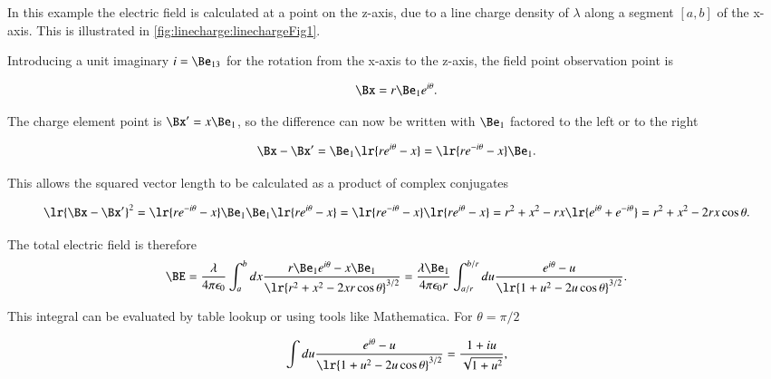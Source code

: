 %
%
In this example the electric field is calculated at a point on the z-axis, due to a line charge density of \( \lambda \) along a segment \( [a,b] \) of the x-axis.
This is illustrated in \cref{fig:linecharge:linechargeFig1}.

Introducing a unit imaginary \( i = \Be_{13} \) for the rotation from the x-axis to the z-axis, the field point observation point is

\begin{dmath}\label{eqn:linecharge:120}
\Bx = r \Be_1 e^{i \theta}.
\end{dmath}

The charge element point is \( \Bx' = x \Be_1 \), so the difference can now be written with \( \Be_1 \) factored to the left or to the right

\begin{equation}\label{eqn:linecharge:20}
\Bx - \Bx'
= \Be_1\lr{ r e^{i\theta} - x }
= \lr{ r e^{-i\theta} - x } \Be_1.
\end{equation}

This allows the squared vector length to be calculated as a product of complex conjugates

\begin{dmath}\label{eqn:linecharge:40}
\lr{ \Bx - \Bx' }^2
= \lr{ r e^{-i\theta} - x } \Be_1 \Be_1\lr{ r e^{i\theta} - x }
= \lr{ r e^{-i\theta} - x } \lr{ r e^{i\theta} - x }
= r^2 + x^2 - r x \lr{ e^{i\theta} + e^{-i\theta} }
= r^2 + x^2 - 2 r x \cos\theta.
\end{dmath}

The total electric field is therefore
\begin{dmath}\label{eqn:linecharge:60}
\BE
= \frac{\lambda}{4 \pi \epsilon_0} \int_a^b dx \frac{ r \Be_1 e^{i\theta} - x \Be_1 }{ \lr{ r^2 + x^2 - 2 x r \cos\theta }^{3/2} }
= \frac{\lambda \Be_1}{4 \pi \epsilon_0 r} \int_{a/r}^{b/r} du \frac{ e^{i\theta} - u }{ \lr{ 1 + u^2 - 2 u \cos\theta }^{3/2} }.
\end{dmath}

This integral can be evaluated by table lookup or using tools like Mathematica.
For \( \theta = \pi/2 \)

\begin{dmath}\label{eqn:linecharge:80}
\int
du \frac{ e^{i\theta} - u }{ \lr{ 1 + u^2 - 2 u \cos\theta }^{3/2} }
= \frac{1 + i u}{\sqrt{1 + u^2}},
\end{dmath}

